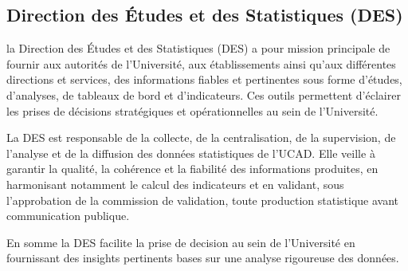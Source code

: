 
\subsection{Direction des Études et des Statistiques (DES)}
la Direction des Études et des Statistiques (DES) a pour mission principale de fournir aux autorités de l'Université, aux établissements ainsi qu'aux différentes directions et services, des informations fiables et pertinentes sous forme d'études, d'analyses, de tableaux de bord et d'indicateurs. Ces outils permettent d'éclairer les prises de décisions stratégiques et opérationnelles au sein de l'Université.

La DES est responsable de la collecte, de la centralisation, de la supervision, de l'analyse et de la diffusion des données statistiques de l'UCAD. Elle veille à garantir la qualité, la cohérence et la fiabilité des informations produites, en harmonisant notamment le calcul des indicateurs et en validant, sous l'approbation de la commission de validation, toute production statistique avant communication publique.

En somme la DES facilite la prise de decision au sein de l'Université en fournissant des insights pertinents bases sur une analyse rigoureuse des données. 
